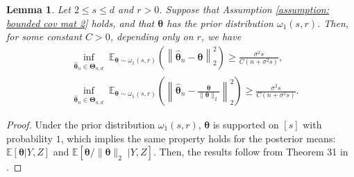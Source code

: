 \documentclass[aos,preprint]{imsart}
\theoremstyle{plain}
\newtheorem{lemma}[theorem]{Lemma}
\theoremstyle{definition}
\newcommand{\btheta}{\boldsymbol{\theta}}
\newcommand{\bd}[1]{\boldsymbol{#1}}
\newcommand{\hbtheta}{\widehat{\boldsymbol{\theta}}}
\newcommand{\bSigma}{\boldsymbol{\Sigma}}
\newcommand{\mR}{\mathbb{R}}
\newcommand{\mI}{\mathcal{I}}
\newcommand{\bZ}{\boldsymbol{Z}}
\newcommand{\Exp}{\mathbb{E}}
\begin{document}
\begin{appendix}
\begin{lemma}\label{lemma: K known}
Let $2 \leq s\leq  d$ and $r > 0$. 
Suppose that Assumption \ref{assumption: bounded cov mat 2} holds, and that $\btheta$ has the prior distribution $\omega_1(s,r)$. Then, for some constant $C>0$, depending only on $r$, we have
\begin{align*}
    &\inf_{\hbtheta_n \in \bd{\Theta}_{n,d}}\; \Exp_{\btheta\sim \omega_1(s,r)}  \left(\left\|\hbtheta_n-\btheta \right\|_2^2 \right) \ge \frac{\sigma^2 s}{C(n+\sigma^2 s)},\\
    &\inf_{\hbtheta_n \in \bd{\Theta}_{n,d}}\; \Exp_{\btheta\sim \omega_1(s,r)}  \left(\left\|\hbtheta_n-\frac{\btheta}{\|\btheta\|_2} \right\|_2^2 \right) \ge \frac{\sigma^2 s}{C(n+\sigma^2 s)}.
\end{align*}
\end{lemma}
\begin{proof}
Under the prior distribution  $\omega_1(s,r)$, $\btheta$ is supported on $[s]$ with probability $1$, which implies the same property holds for the posterior means: $\Exp[\btheta|Y,Z]$ and 
$\Exp[\btheta/\|\btheta\|_2\;|Y,Z]$. Then, the results follow from Theorem 31 in \cite{song2022truncated}.
\end{proof}

\end{appendix}
\end{document}
